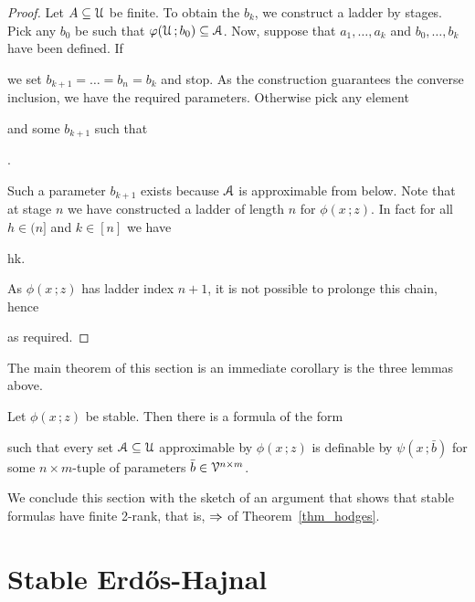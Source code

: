 \documentclass[scombinatorics.tex]{subfiles}
\begin{document}
\begin{proof}
  Let $A\subseteq\EuScript U$ be finite.
  To obtain the $b_k$, we construct a ladder by stages.
  Pick any $b_0$ be such that $\varphi(\EuScript U\,;b_0)\subseteq\EuScript A$.
  Now, suppose that $a_1,\dots,a_k$ and $b_0,\dots,b_k$ have been defined.
  If 
  \\[-1ex]

  we set $b_{k+1}=\dots=b_n=b_k$ and stop.
  As the construction guarantees the converse inclusion, we have the required parameters.
  Otherwise pick any element


  and some $b_{k+1}$ such that

  .

  Such a parameter $b_{k+1}$ exists because $\EuScript A$ is approximable from below.
  Note that at stage $n$ we have constructed a ladder of length $n$ for $\phi(x\,;z)$.
  In fact for all $h\in(n]$ and $k\in[n]$ we have
  
  {\IFF}
  {h\le k.}
  
  As $\phi(x\,;z)$ has ladder index $n+1$, it is not possible to prolonge this chain, hence


  as required.
\end{proof}
  
The main theorem of this section is an immediate corollary is the three lemmas above.

\begin{theorem}\label{thm_stable_definability}
  Let $\phi(x\,;z)$ be stable.
  Then there is a formula of the form

  
  such that every set $\EuScript A\subseteq\EuScript U$ approximable by  $\phi(x\,;z)$ is definable by $\psi(x\,;\bar b)$ for some $n{\times}m$-tuple of parameters $\bar b\in\EuScript V^{n\times m}$.\QED
\end{theorem}

We conclude this section with the sketch of an argument that shows that stable formulas have finite 2-rank, that is, $\Rightarrow$ of Theorem~\ref{thm_hodges}.


\section{Stable Erd\H{o}s-Hajnal}
\end{document}
